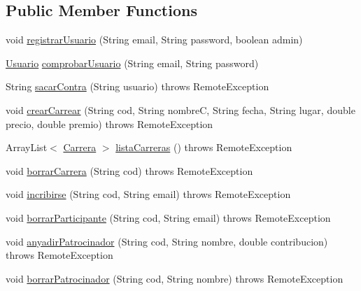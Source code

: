 \subsection*{Public Member Functions}
\begin{DoxyCompactItemize}
\item 
void \mbox{\hyperlink{classes_1_1deusto_1_1server_1_1_server_a0f79b8db6904facdae94410e26bef452}{registrar\+Usuario}} (String email, String password, boolean admin)
\item 
\mbox{\hyperlink{classes_1_1deusto_1_1server_1_1jdo_1_1_usuario}{Usuario}} \mbox{\hyperlink{classes_1_1deusto_1_1server_1_1_server_afa3e758715cbf321f9c1cbe08a8583a4}{comprobar\+Usuario}} (String email, String password)
\item 
String \mbox{\hyperlink{classes_1_1deusto_1_1server_1_1_server_aefe051d880626950ea2964d89a4ae3c3}{sacar\+Contra}} (String usuario)  throws Remote\+Exception 
\item 
void \mbox{\hyperlink{classes_1_1deusto_1_1server_1_1_server_a22d31cd9642f978f1995fc7822d99258}{crear\+Carrear}} (String cod, String nombreC, String fecha, String lugar, double precio, double premio)  throws Remote\+Exception
\item 
Array\+List$<$ \mbox{\hyperlink{classes_1_1deusto_1_1server_1_1jdo_1_1_carrera}{Carrera}} $>$ \mbox{\hyperlink{classes_1_1deusto_1_1server_1_1_server_af62ce3462ec30a081db0009d2f2b33bb}{lista\+Carreras}} ()  throws Remote\+Exception
\item 
void \mbox{\hyperlink{classes_1_1deusto_1_1server_1_1_server_a0a3160bdb7bfaab43143f1b0e68aee51}{borrar\+Carrera}} (String cod)  throws Remote\+Exception
\item 
void \mbox{\hyperlink{classes_1_1deusto_1_1server_1_1_server_a19df52b26da7c83b2e7f13a6aab45633}{incribirse}} (String cod, String email)  throws Remote\+Exception 
\item 
void \mbox{\hyperlink{classes_1_1deusto_1_1server_1_1_server_a60cba3edcdffc7f50d4fa1f55b54ce76}{borrar\+Participante}} (String cod, String email)  throws Remote\+Exception 
\item 
void \mbox{\hyperlink{classes_1_1deusto_1_1server_1_1_server_ab38b8a38462608f1537cd7666e8ce0db}{anyadir\+Patrocinador}} (String cod, String nombre, double contribucion)  throws Remote\+Exception 
\item 
void \mbox{\hyperlink{classes_1_1deusto_1_1server_1_1_server_ae8d6c0fcd5fd2412451c9abcd7927b3d}{borrar\+Patrocinador}} (String cod, String nombre)  throws Remote\+Exception 
\end{DoxyCompactItemize}
